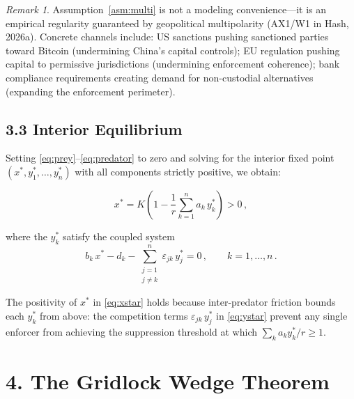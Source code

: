 \documentclass[12pt]{article}
\theoremstyle{definition}
\theoremstyle{remark}
\newtheorem*{remark}{Remark}
\begin{document}
\begin{remark}
Assumption~\ref{asm:multi} is not a modeling convenience---it is an
empirical regularity guaranteed by geopolitical multipolarity (AX1/W1 in
Hash, 2026a). Concrete channels include: US sanctions pushing sanctioned
parties toward Bitcoin (undermining China's capital controls); EU
regulation pushing capital to permissive jurisdictions (undermining
enforcement coherence); bank compliance requirements creating demand for
non-custodial alternatives (expanding the enforcement perimeter).
\end{remark}

\subsection{3.3 Interior Equilibrium}

Setting \eqref{eq:prey}--\eqref{eq:predator} to zero and solving for
the interior fixed point $(x^{*}, y_1^{*}, \ldots, y_n^{*})$ with all
components strictly positive, we obtain:

\begin{equation}\label{eq:xstar}
  x^{*} = K \left( 1 - \frac{1}{r} \sum_{k=1}^{n} a_k \, y_k^{*}
  \right) > 0 \,,
\end{equation}

where the $y_k^{*}$ satisfy the coupled system
\begin{equation}\label{eq:ystar}
  b_k \, x^{*} - d_k - \sum_{\substack{j=1 \\ j \neq k}}^{n}
    \varepsilon_{jk} \, y_j^{*} = 0 \,,
    \qquad k = 1, \ldots, n \,.
\end{equation}

The positivity of $x^{*}$ in \eqref{eq:xstar} holds because
inter-predator friction bounds each $y_k^{*}$ from above: the
competition terms $\varepsilon_{jk} \, y_j^{*}$ in
\eqref{eq:ystar} prevent any single enforcer from achieving the
suppression threshold at which $\sum_k a_k y_k^{*} / r \geq 1$.

\section{4. The Gridlock Wedge Theorem}\label{sec:gridlock}
\end{document}
